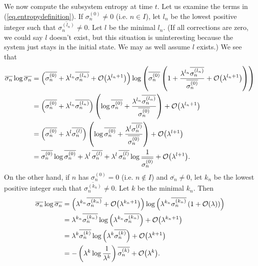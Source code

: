 We now compute the subsystem entropy at time \(t\). Let us examine the terms in (\ref{eq.entropydefinition}).
If \(\sigma_{n}^{(0)} \neq 0\) (i.e. \(n \in I\)), let \(l_n\) be the lowest positive integer such that \(\overline{\sigma_n^{(l_n)}} \neq 0\). Let \(l\) be the minimal \(l_n\). (If all corrections are zero, we could say \(l\) doesn't exist, but this situation is uninteresting because the system just stays in the initial state. We may as well assume \(l\) exists.) We see that
\begin{align*}
\overline{\sigma_n} \log \overline{\sigma_n}
&= \left(\overline{\sigma_n^{(0)}} + \lambda^{l_n} \overline{\sigma_n^{(l_n)}} + \mathcal{O}{\left(\lambda^{l_n+1}\right)}\right) \log \left(\overline{\sigma_n^{(0)}} \left(1 + \frac{\lambda^{l_n} \overline{\sigma_n^{(l_n)}}}{\overline{\sigma_n^{(0)}}}+ \mathcal{O}{\left(\lambda^{l_n+1}\right)}\right)\right) \\
&= \left(\overline{\sigma_n^{(0)}} + \lambda^{l_n} \overline{\sigma_n^{(l_n)}}\right) \left(\log \overline{\sigma_n^{(0)}} + \frac{\lambda^{l_n} \overline{\sigma_n^{(l_n)}}}{\overline{\sigma_n^{(0)}}}\right) + \mathcal{O}{\left(\lambda^{l_n+1}\right)}\\
&= \left(\overline{\sigma_n^{(0)}} + \lambda^{l} \overline{\sigma_n^{(l)}}\right) \left(\log \overline{\sigma_n^{(0)}} + \frac{\lambda^{l} \overline{\sigma_n^{(l)}}}{\overline{\sigma_n^{(0)}}}\right) + \mathcal{O}{\left(\lambda^{l+1}\right)}\\
&=  \overline{\sigma_n^{(0)}} \log \overline{\sigma_n^{(0)}} + \lambda^l\, \overline{\sigma_n^{(l)}} + \lambda^l\, \overline{\sigma_n^{(l)}}\log \frac{1}{\overline{\sigma_n^{(0)}}} + \mathcal{O}{\left(\lambda^{l+1}\right)}.
\end{align*}
On the other hand, if \(n\) has \(\sigma_{n}^{(0)} = 0\) (i.e. \(n \not\in I\)) and \(\overline{\sigma_n}\neq 0\), let \(k_n\) be the lowest positive integer such that \(\overline{\sigma_n^{(k_n)}} \neq 0\). Let \(k\) be the minimal \(k_n\). Then
\begin{align*}
\overline{\sigma_n} \log \overline{\sigma_n}
&= \left(\lambda^{k_n}\overline{\sigma_n^{(k_n)}} + \mathcal{O}{\left(\lambda^{k_n+1}\right)}\right) \log\left(\lambda^{k_n}\overline{\sigma_n^{(k_n)}}\left(1 + \mathcal{O}{\left(\lambda\right)}\right)\right) \\
&= \lambda^{k_n}\overline{\sigma_n^{(k_n)}} \log\left(\lambda^{k_n}\overline{\sigma_n^{(k_n)}}\right)+ \mathcal{O}{\left(\lambda^{k_n+1}\right)}\\
&= \lambda^{k}\overline{\sigma_n^{(k)}} \log\left(\lambda^{k}\overline{\sigma_n^{(k)}}\right)+ \mathcal{O}{\left(\lambda^{k+1}\right)} \\
&= -\left(\lambda^{k}\log\frac{1}{\lambda^k}\right)\overline{\sigma_n^{(k)}} + \mathcal{O}{\left(\lambda^{k}\right)}.
\end{align*}
